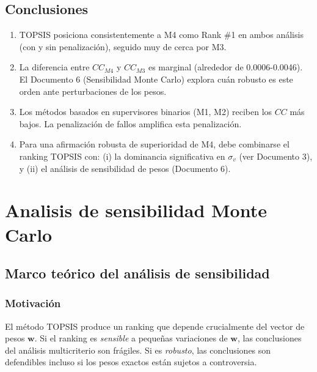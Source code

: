 \documentclass[12pt,a4paper,oneside]{book}
\begin{document}
\section{Conclusiones}

\begin{enumerate}[leftmargin=*]
    \item TOPSIS posiciona consistentemente a M4 como Rank \#1 en ambos análisis (con y sin penalización), seguido muy de cerca por M3.
    \item La diferencia entre $CC_{M4}$ y $CC_{M3}$ es marginal (alrededor de 0.0006-0.0046). El Documento 6 (Sensibilidad Monte Carlo) explora cuán robusto es este orden ante perturbaciones de los pesos.
    \item Los métodos basados en supervisores binarios (M1, M2) reciben los $CC$ más bajos. La penalización de fallos amplifica esta penalización.
    \item Para una afirmación robusta de superioridad de M4, debe combinarse el ranking TOPSIS con: (i) la dominancia significativa en $\sigma_v$ (ver Documento 3), y (ii) el análisis de sensibilidad de pesos (Documento 6).
\end{enumerate}



\chapter{Analisis de sensibilidad Monte Carlo}
\label{chap:montecarlo}




\section{Marco teórico del análisis de sensibilidad}

\subsection{Motivación}

El método TOPSIS produce un ranking que depende crucialmente del vector de pesos $\mathbf{w}$. Si el ranking es \emph{sensible} a pequeñas variaciones de $\mathbf{w}$, las conclusiones del análisis multicriterio son frágiles. Si es \emph{robusto}, las conclusiones son defendibles incluso si los pesos exactos están sujetos a controversia.
\end{document}
